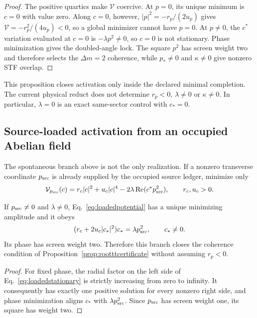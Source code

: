 \begin{proof}
The positive quartics make $\mathcal V$ coercive.  At $p=0$, its unique
minimum is $c=0$ with value zero.  Along $c=0$, however,
$|p|^2=-r_p/(2u_p)$ gives $\mathcal V=-r_p^2/(4u_p)<0$, so a global minimizer
cannot have $p=0$.  At $p\neq0$, the $c^*$ variation evaluated at $c=0$ is
$-\lambda p^2\neq0$, so $c=0$ is not stationary.  Phase minimization gives
the doubled-angle lock.  The square $p^2$ has screen weight two and therefore
selects the $\Delta m=2$ coherence, while $p_*\neq0$ and $\kappa\neq0$ give
nonzero STF overlap.
\end{proof}

This proposition closes activation only inside the declared minimal
completion.  The current physical reduct does not determine $r_p<0$,
$\lambda\neq0$ or $\kappa\neq0$.  In particular, $\lambda=0$ is an exact
same-sector control with $c_*=0$.

\subsection{Source-loaded activation from an occupied Abelian field}

The spontaneous branch above is not the only realization.  If a nonzero
transverse coordinate $p_{\rm src}$ is already supplied by the occupied
source ledger, minimize only
\begin{equation}
\mathcal V_{p_{\rm src}}(c)=r_c|c|^2+u_c|c|^4
-2\lambda\operatorname{Re}(c^*p_{\rm src}^2),
\qquad r_c,u_c>0.
\label{eq:loadedpotential}
\end{equation}

\begin{proposition}
If $p_{\rm src}\neq0$ and $\lambda\neq0$, Eq.~\eqref{eq:loadedpotential}
has a unique minimizing amplitude and it obeys
\begin{equation}
(r_c+2u_c|c_*|^2)c_*=\lambda p_{\rm src}^2,
\qquad c_*\neq0.
\label{eq:loadedstationary}
\end{equation}
Its phase has screen weight two.  Therefore this branch closes the coherence
condition of Proposition~\ref{prop:rootttcertificate} without assuming
$r_p<0$.
\end{proposition}

\begin{proof}
For fixed phase, the radial factor on the left side of
Eq.~\eqref{eq:loadedstationary} is strictly increasing from zero to infinity.
It consequently has exactly one positive solution for every nonzero right
side, and phase minimization aligns $c_*$ with
$\lambda p_{\rm src}^2$.  Since $p_{\rm src}$ has screen weight one, its
square has weight two.
\end{proof}

